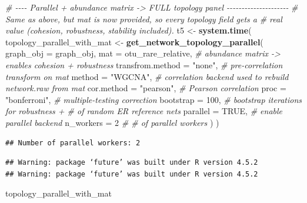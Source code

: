 \documentclass[
]{book}
\newenvironment{Shaded}{\begin{snugshade}}{\end{snugshade}}
\newcommand{\AttributeTok}[1]{\textcolor[rgb]{0.13,0.29,0.53}{#1}}
\newcommand{\CommentTok}[1]{\textcolor[rgb]{0.56,0.35,0.01}{\textit{#1}}}
\newcommand{\ConstantTok}[1]{\textcolor[rgb]{0.56,0.35,0.01}{#1}}
\newcommand{\DecValTok}[1]{\textcolor[rgb]{0.00,0.00,0.81}{#1}}
\newcommand{\FunctionTok}[1]{\textcolor[rgb]{0.13,0.29,0.53}{\textbf{#1}}}
\newcommand{\NormalTok}[1]{#1}
\newcommand{\OtherTok}[1]{\textcolor[rgb]{0.56,0.35,0.01}{#1}}
\newcommand{\StringTok}[1]{\textcolor[rgb]{0.31,0.60,0.02}{#1}}
\begin{document}
\begin{Shaded}
\begin{Highlighting}[]
\CommentTok{\# {-}{-}{-}{-} Parallel + abundance matrix {-}\textgreater{} FULL topology panel {-}{-}{-}{-}{-}{-}{-}{-}{-}{-}{-}{-}{-}{-}{-}{-}{-}{-}{-}{-}{-}}
\CommentTok{\# Same as above, but \textasciigrave{}mat\textasciigrave{} is now provided, so every topology field gets a}
\CommentTok{\# real value (cohesion, robustness, stability included).}
\NormalTok{t5 }\OtherTok{\textless{}{-}} \FunctionTok{system.time}\NormalTok{(}
\NormalTok{  topology\_parallel\_with\_mat }\OtherTok{\textless{}{-}} \FunctionTok{get\_network\_topology\_parallel}\NormalTok{(}
    \AttributeTok{graph\_obj        =}\NormalTok{ graph\_obj,}
    \AttributeTok{mat              =}\NormalTok{ otu\_rare\_relative, }\CommentTok{\# abundance matrix {-}\textgreater{} enables cohesion + robustness}
    \AttributeTok{transfrom.method =} \StringTok{"none"}\NormalTok{,            }\CommentTok{\# pre{-}correlation transform on \textasciigrave{}mat\textasciigrave{}}
    \AttributeTok{method           =} \StringTok{"WGCNA"}\NormalTok{,           }\CommentTok{\# correlation backend used to rebuild network.raw from \textasciigrave{}mat\textasciigrave{}}
    \AttributeTok{cor.method       =} \StringTok{"pearson"}\NormalTok{,         }\CommentTok{\# Pearson correlation}
    \AttributeTok{proc             =} \StringTok{"bonferroni"}\NormalTok{,      }\CommentTok{\# multiple{-}testing correction}
    \AttributeTok{bootstrap        =} \DecValTok{100}\NormalTok{,               }\CommentTok{\# bootstrap iterations for robustness + \# of random ER reference nets}
    \AttributeTok{parallel         =} \ConstantTok{TRUE}\NormalTok{,              }\CommentTok{\# enable parallel backend}
    \AttributeTok{n\_workers        =} \DecValTok{2}                  \CommentTok{\# \# of parallel workers}
\NormalTok{  )}
\NormalTok{)}
\end{Highlighting}
\end{Shaded}

\begin{verbatim}
## Number of parallel workers: 2
\end{verbatim}

\begin{verbatim}
## Warning: package ‘future’ was built under R version 4.5.2
## Warning: package ‘future’ was built under R version 4.5.2
\end{verbatim}

\begin{Shaded}
\begin{Highlighting}[]
\NormalTok{topology\_parallel\_with\_mat}
\end{Highlighting}
\end{Shaded}
\end{document}
